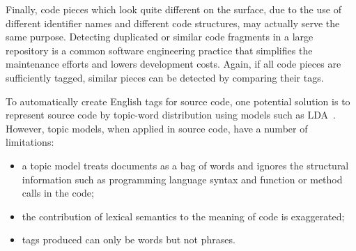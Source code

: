 Finally, code pieces which look quite different on the surface, due to
the use of different identifier names and different code structures,
may actually serve the same purpose.
Detecting duplicated or similar code fragments in a large repository
is a common software engineering practice that simplifies the maintenance
efforts and lowers development costs. Again, if all code pieces are sufficiently
tagged, similar pieces can be detected by comparing their tags.

To automatically create English tags for source code, one potential
solution is to represent source code by topic-word distribution using models
such as LDA~\cite{blei2003latent}. However, topic models, when applied
in source code, have a number of limitations:
\begin{itemize}
\item a topic model treats documents as a bag of words and ignores the
structural information such as programming language syntax and
function or method calls in the code;
\item the contribution of lexical semantics to the meaning of code
is exaggerated;
\item tags produced can only be words but not phrases.
\end{itemize}

